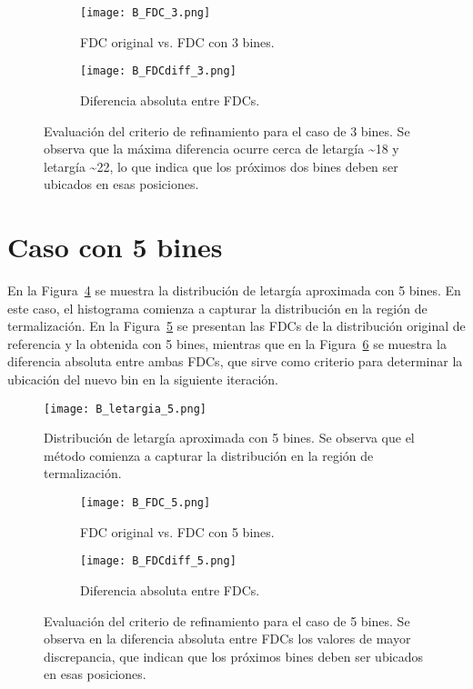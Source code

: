 \begin{figure}[H]
    \centering
    \begin{subfigure}[b]{0.46\textwidth}
        \texttt{[image: B\_FDC\_3.png]}
        \caption{FDC original vs. FDC con 3 bines.}
        \label{fig:B_FDC_3}
    \end{subfigure}
    \hfill
    \begin{subfigure}[b]{0.46\textwidth}
        \texttt{[image: B\_FDCdiff\_3.png]}
        \caption{Diferencia absoluta entre FDCs.}
        \label{fig:B_FDCdiff_3}
    \end{subfigure}
    \caption{Evaluación del criterio de refinamiento para el caso de 3 bines. Se observa que la máxima diferencia ocurre cerca de letargía \sim 18 y letargía \sim 22, lo que indica que los próximos dos bines deben ser ubicados en esas posiciones.}
    \label{fig:B_FDC_3_3}
\end{figure}

\section*{Caso con 5 bines}

En la Figura~\ref{fig:B_letargia_5} se muestra la distribución de letargía aproximada con 5 bines. En este caso, el histograma comienza a capturar la distribución en la región de termalización. En la Figura~\ref{fig:B_FDC_5} se presentan las FDCs de la distribución original de referencia y la obtenida con 5 bines, mientras que en la Figura~\ref{fig:B_FDCdiff_5} se muestra la diferencia absoluta entre ambas FDCs, que sirve como criterio para determinar la ubicación del nuevo bin en la siguiente iteración.

\begin{figure}[H]
    \centering
    \texttt{[image: B\_letargia\_5.png]}
    \caption{Distribución de letargía aproximada con 5 bines. Se observa que el método comienza a capturar la distribución en la región de termalización.}
    \label{fig:B_letargia_5}
\end{figure}

\begin{figure}[H]
    \centering
    \begin{subfigure}[b]{0.46\textwidth}
        \texttt{[image: B\_FDC\_5.png]}
        \caption{FDC original vs. FDC con 5 bines.}
        \label{fig:B_FDC_5}
    \end{subfigure}
    \hfill
    \begin{subfigure}[b]{0.46\textwidth}
        \texttt{[image: B\_FDCdiff\_5.png]}
        \caption{Diferencia absoluta entre FDCs.}
        \label{fig:B_FDCdiff_5}
    \end{subfigure}
    \caption{Evaluación del criterio de refinamiento para el caso de 5 bines. Se observa en la diferencia absoluta entre FDCs los valores de mayor discrepancia, que indican que los próximos bines deben ser ubicados en esas posiciones.}
    \label{fig:B_FDC_5_5}
\end{figure}

